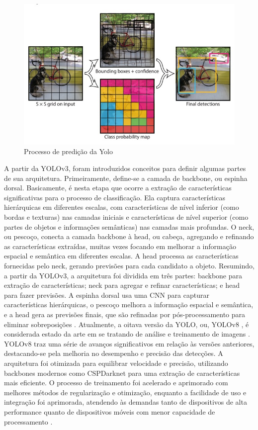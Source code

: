 \begin{figure}[!h]
    \center
    \begin{minipage}{0.9\linewidth}
    \center
    \captionsetup{justification=centering,margin=0.5cm,font=small}
    \includegraphics[width=0.7\linewidth]{img/cap2/processo-predicao-YOLO.jpeg}
    \caption{ Processo de predição da Yolo \cite{redmon2016youlookonce}} \label{fig:yolo}
    \end{minipage}
\end{figure}
A partir da YOLOv3, foram introduzidos conceitos para definir algumas partes de sua arquitetura. Primeiramente, define-se a camada de backbone, ou espinha dorsal. Basicamente, é nesta etapa que ocorre a extração de características significativas para o processo de classificação. Ela captura características hierárquicas em diferentes escalas, com características de nível inferior (como bordas e texturas) nas camadas iniciais e características de nível superior (como partes de objetos e informações semânticas) nas camadas mais profundas. O neck, ou pescoço, conecta a camada backbone à head, ou cabeça, agregando e refinando as características extraídas, muitas vezes focando em melhorar a informação espacial e semântica em diferentes escalas. A head processa as características fornecidas pelo neck, gerando previsões para cada candidato a objeto. Resumindo, a partir da YOLOv3, a arquitetura foi dividida em três partes: backbone para extração de características; neck para agregar e refinar características; e head para fazer previsões. A espinha dorsal usa uma CNN para capturar características hierárquicas, o pescoço melhora a informação espacial e semântica, e a head gera as previsões finais, que são refinadas por pós-processamento para eliminar sobreposições \cite{terven2023comprehensive}.
Atualmente, a oitava versão da YOLO, ou, YOLOv8 , é considerada estado da arte em se tratando de análise e treinamento de imagens \cite{ultralytics2024}. YOLOv8 traz uma série de avanços significativos em relação às versões anteriores, destacando-se pela melhoria no desempenho e precisão das detecções. A arquitetura foi otimizada para equilibrar velocidade e precisão, utilizando backbones modernos como CSPDarknet para uma extração de características mais eficiente. O processo de treinamento foi acelerado e aprimorado com melhores métodos de regularização e otimização, enquanto a facilidade de uso e integração foi aprimorada, atendendo às demandas tanto de dispositivos de alta performance quanto de dispositivos móveis com menor capacidade de processamento \cite{hussain2023yolo}.


